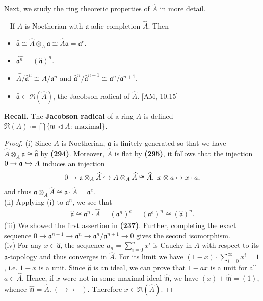 \documentclass[12pt,a4paper,footinclude=true,headinclude=true]{scrbook} %
\newenvironment{lemma}[2][]
{\renewcommand\theinnercustomlemma{#2}\innercustomlemma[#1]
\begin{mdframed}[backgroundcolor=gray!20]\ }
{\end{mdframed}\endinnercustomprop}
\begin{document}
Next, we study the ring theoretic properties of $\widehat{A}$ in more detail.
\begin{lemma}{296}
    If $A$ is Noetherian with $\mathfrak{a}$-adic completion $\widehat{A}$. Then
    \begin{itemize}
        \item[(a)] $\widehat{\mathfrak{a}}\cong\widehat{A}\otimes_A\mathfrak{a}\cong\widehat{A}\mathfrak{a}=\mathfrak{a}^e$.
        \item[(b)] $\widehat{\mathfrak{a}^n}=(\widehat{\mathfrak{a}})^n$.
        \item[(c)] $\widehat{A}/\widehat{\mathfrak{a}}^n\cong A/\mathfrak{a}^n$ and $\widehat{\mathfrak{a}}^n/\widehat{\mathfrak{a}}^{n+1}\cong\mathfrak{a}^n/\mathfrak{a}^{n+1}$.
        \item[(d)] $\widehat{\mathfrak{a}}\subset\mathfrak{R}(\widehat{A})$, the Jacobson radical of $\widehat{A}$. [AM, 10.15]
    \end{itemize}
    \textbf{Recall.} The \textbf{Jacobson radical} of a ring $A$ is defined $\mathfrak{R}(A)\coloneqq\bigcap\{\mathfrak{m}\triangleleft A:\ \text{maximal}\}$. 
\end{lemma}
\begin{proof}
    (i) Since $A$ is Noetherian, $\mathfrak{a}$ is finitely generated so that we have $\widehat{A}\otimes_A\mathfrak{a}\cong\widehat{\mathfrak{a}}$ by \textbf{(294)}. Moreover, $\widehat{A}$ is flat by \textbf{(295)}, it follows that the injection $0\to\mathfrak{a}\xhookrightarrow{} A$ induces an injection
    \begin{align*}
        0\to\mathfrak{a}\otimes_A\widehat{A}\xhookrightarrow{} A\otimes_A\widehat{A}\cong\widehat{A},\ x\otimes a\mapsto x\cdot a,
    \end{align*}
    and thus $\mathfrak{a}\otimes_A\widehat{A}\cong\mathfrak{a}\cdot\widehat{A}=\mathfrak{a}^e$.\\ (ii) Applying (i) to $\mathfrak{a}^n$, we see that
    \begin{align*}
        \widehat{\mathfrak{a}}\cong\mathfrak{a}^n\cdot\widehat{A}=(\mathfrak{a}^n)^e=(\mathfrak{a}^e)^n\cong(\widehat{\mathfrak{a}})^n.
    \end{align*}
    (iii) We showed the first assertion in \textbf{(237)}. Further, completing the exact sequence $0\to\mathfrak{a}^{n+1}\to\mathfrak{a}^n\to\mathfrak{a}^n/\mathfrak{a}^{n+1}\to0$ gives the second isomorphism.\\
    (iv) For any $x\in\widehat{\mathfrak{a}}$, the sequence $a_n=\sum_{i=0}^nx^i$ is Cauchy in $A$ with respect to its $\mathfrak{a}$-topology and thus converges in $\widehat{A}$. For its limit we have $(1-x)\cdot\sum_{i=0}^\infty x^i=1$, i.e. $1-x$ is a unit. Since $\widehat{\mathfrak{a}}$ is an ideal, we can prove that $1-ax$ is a unit for all $a\in\widehat{A}$. Hence, if $x$ were not in some maximal ideal $\widehat{\mathfrak{m}}$, we have $(x)+\widehat{\mathfrak{m}}=(1)$, whence $\widehat{\mathfrak{m}}=\widehat{A}.\ (\to\gets)$. Therefore $x\in\mathfrak{R}(\widehat{A})$.
\end{proof}
\end{document}
